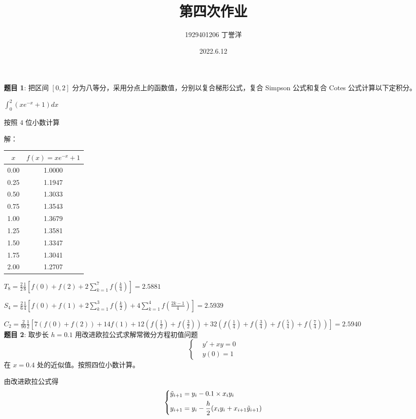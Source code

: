 \documentclass{article}
\title{第四次作业}
\author{1929401206 丁誉洋}
\date{2022.6.12}
\begin{document}
\maketitle

\noindent\textbf{题目 1}: 把区间 $[0, 2]$ 分为八等分，采用分点上的函数值，分别以复合梯形公式，复合 Simpson 公式和复合 Cotes 公式计算以下定积分。

$\int_0^2(xe^{-x} + 1)dx$

按照 $4$ 位小数计算

\noindent 解：

\begin{center}
\begin{tabular}{|c|c|}
    \hline
    $x$ & $f(x) = xe^{-x} + 1$ \\
    \hline
    0.00 & 1.0000 \\
    \hline
    0.25 & 1.1947 \\
    \hline
    0.50 & 1.3033 \\
    \hline
    0.75 & 1.3543 \\
    \hline
    1.00 & 1.3679 \\
    \hline
    1.25 & 1.3581 \\
    \hline
    1.50 & 1.3347 \\
    \hline
    1.75 & 1.3041 \\
    \hline
    2.00 & 1.2707 \\
    \hline
\end{tabular}
\end{center}

$T_8 = \frac{2}{2}\frac{1}{8}[f(0) + f(2) + 2\sum\limits_{k = 1}^{7}f(\frac{k}{4})] = 2.5881$

$S_4 = \frac{2}{6}\frac{1}{4}[f(0) + f(1) + 2\sum\limits_{k = 1}^3f(\frac{k}{2}) + 4\sum\limits_{k = 1}^4f(\frac{2k - 1}{4})] = 2.5939$

$C_2 = \frac{2}{90}\frac{1}{2}[7(f(0) + f(2)) + 14f(1) + 12(f(\frac{1}{2}) + f(\frac{3}{2})) + 32(f(\frac{1}{4}) + f(\frac{3}{4}) + f(\frac{5}{4}) + f(\frac{7}{4}))] = 2.5940$ \\

\noindent\textbf{题目 2}: 取步长 $h = 0.1$ 用改进欧拉公式求解常微分方程初值问题
$$
\left\{
\begin{aligned}
&y' + xy = 0 \\
&y(0) = 1
\end{aligned}
\right.
$$
在 $x = 0.4$ 处的近似值。按照四位小数计算。


由改进欧拉公式得
$$
\left\{
\begin{aligned}
\Tilde{y}_{i + 1} &= y_i - 0.1\times x_iy_i \\
y_{i + 1} &= y_i - \frac{h}{2}(x_iy_i + x_{i + 1}\Tilde{y}_{i + 1})
\end{aligned}
\right.
$$
\end{document}
